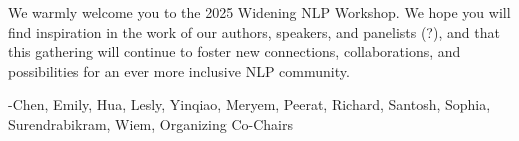 \vspace{\baselineskip}

We warmly welcome you to the 2025 Widening NLP Workshop. We hope you will find inspiration in the work of our authors, speakers, and panelists (?), and that this gathering will continue to foster new connections, collaborations, and possibilities for an ever more inclusive NLP community.

\vspace{\baselineskip}

-Chen, Emily, Hua, Lesly, Yinqiao, Meryem, Peerat, Richard, Santosh, Sophia, Surendrabikram, Wiem, Organizing Co-Chairs